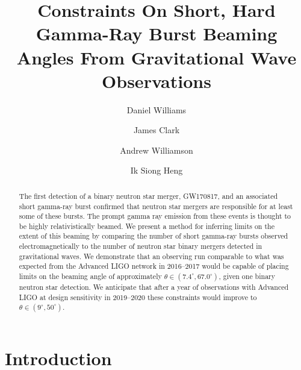 \documentclass[twocolumn]{aastex61}
\begin{document}
\title{Constraints On Short, Hard Gamma-Ray Burst Beaming Angles From
Gravitational Wave Observations}

\author[0000-0003-3772-198X]{Daniel Williams}
\author{James Clark}
\author{Andrew Williamson}
\author{Ik Siong Heng}





\begin{abstract}
The first detection of a binary neutron star merger, GW170817, and an associated
short gamma-ray burst confirmed that neutron star mergers are responsible for at
least some of these bursts. The prompt gamma ray emission from these events is
thought to be highly relativistically beamed. We present a method for inferring
limits on the extent of this beaming by comparing the number of short gamma-ray
bursts observed electromagnetically to the number of neutron star binary mergers
detected in gravitational waves.
We demonstrate that an observing run comparable to what was expected
from the Advanced LIGO network in 2016--2017 would be capable
of placing limits on the beaming angle of approximately
$\theta \in (7.4^\circ,67.0^\circ)$, given one binary neutron star
detection.
We anticipate that after a year of observations with Advanced LIGO at design
sensitivity in 2019--2020 these constraints would improve to
$\theta \in (9^\circ,50^\circ)$. 
\end{abstract}


\section{Introduction}
\end{document}
